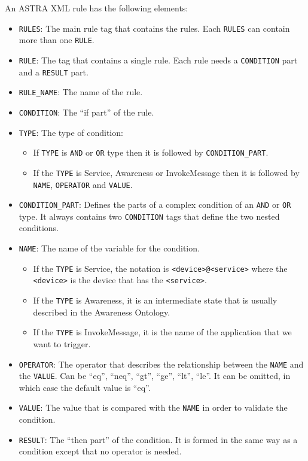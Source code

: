 An ASTRA XML rule has the following elements:
\begin{itemize}
  \item \verb|RULES|: The main rule tag that contains the rules. Each
  \verb|RULES| can contain more than one \verb|RULE|.
  \item \verb|RULE|: The tag that contains a single rule. Each rule needs a
  \verb|CONDITION| part and a \verb|RESULT| part.
   \item \verb|RULE_NAME|: The name of the rule.
   \item \verb|CONDITION|: The ``if part'' of the rule.
   \item \verb|TYPE|: The type of condition:
	\begin{itemize}
         \item If \verb|TYPE| is \verb|AND| or \verb|OR| type then it is
         followed by \verb|CONDITION_PART|.
         \item  If the \verb|TYPE| is Service, Awareness or InvokeMessage
         then it is followed by \verb|NAME|, \verb|OPERATOR| and \verb|VALUE|.
    \end{itemize}

   \item \verb|CONDITION_PART|: Defines the parts of a complex condition of an
   \verb|AND| or \verb|OR| type. It always contains two \verb|CONDITION| tags
   that define the two nested conditions.
  \item \verb|NAME|: The name of the variable for the condition.
	\begin{itemize}
      \item  If the \verb|TYPE| is Service, the notation is 
      \verb|<device>@<service>| where the \verb|<device>| is the device that 
      has the \verb|<service>|.
      \item If the \verb|TYPE| is Awareness, it is an intermediate state that 
      is usually described in the Awareness Ontology.
      \item If the \verb|TYPE| is InvokeMessage, it is the name of the
      application that we want to trigger.
    \end{itemize}
  \item \verb|OPERATOR|: The operator that describes the relationship between
	the \verb|NAME| and the \verb|VALUE|. Can be ``eq'', ``neq'', ``gt'', ``ge'',
	``lt'', ``le''. It can be omitted, in which case the default value is ``eq''.
   \item  \verb|VALUE|: The value that is compared with the \verb|NAME| in
   order to validate the condition.
  \item \verb|RESULT|: The ``then part'' of the condition. It is formed in the same
  way as a condition except that no operator is needed.
\end{itemize}


